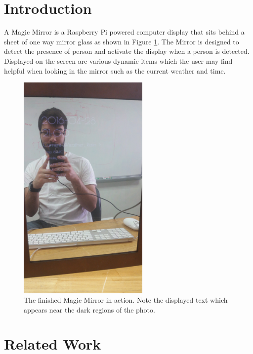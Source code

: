 \documentclass[conference]{IEEEtran}
\begin{document}
\section{Introduction}
A Magic Mirror is a Raspberry Pi powered computer display that sits behind a sheet of one way mirror glass as shown in Figure \ref{fig:mirror}.
The Mirror is designed to detect the presence of person and activate the display when a person is detected.
Displayed on the screen are various dynamic items which the user may find helpful when looking in the mirror such as the current weather and time.
\begin{figure}[!ht]
\centering
\includegraphics[width=2.5in, angle=-90]{images/Mirror.jpg}
\caption{The finished Magic Mirror in action. Note the displayed text which appears near the dark regions of the photo.}
\label{fig:mirror}
\end{figure}


\section{Related Work}  
\end{document}
